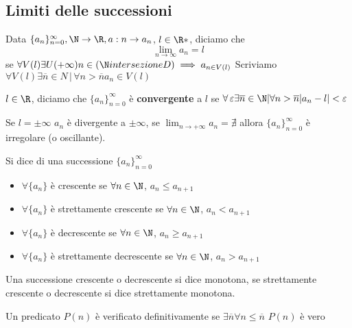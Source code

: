 \subsection{Limiti delle successioni}

Data $ \{a_{n} \}_{n=0}^\infty, \N \to \R, a: n\to a_{n}  $, $l \in \R*$, diciamo che 
\[
    \lim_{n\to\infty}a_{n}=l  
\]
se $\forall V(l) \exists U(+\infty) n \in(\N intersezione D) \implies a_{n \in V(l)}$
Scriviamo $\forall V(l) \exists \overline{n} \in N \,|\, \forall n>\overline{n} a_{n} \in V(l)$

$l\in \R$, diciamo che $ \{a_{n} \}_{n=0}^\infty $ è \textbf{convergente} a $ l $ se $ \forall\, \varepsilon \exists \overline{n} \in \N | \forall n>\overline{n} |a_{n} -l |<\varepsilon  $

Se $ l=\pm \infty $ $a_{n}$ è divergente a $ \pm\infty $, se $ \lim_{n\to+\infty} a_{n}=\nexists $ allora $ \{a_{n}\}_{n=0 }^\infty$ è irregolare (o oscillante).



Si dice di una successione $\{a_{n} \}_{n=0}^\infty$

\begin{itemize}
    \item $\forall \{a_{n} \}$ è crescente se $ \forall n \in \N $, $ a_{n} \le a_{n+1}  $
    \item $\forall\{a_{n} \}$ è strettamente crescente se $ \forall n \in \N $, $ a_{n} < a_{n+1}  $
    \item $\forall\{a_{n} \}$ è decrescente se $ \forall n \in \N $, $ a_{n} \ge a_{n+1}  $
    \item $\forall \{a_{n} \}$ è strettamente decrescente se $ \forall n \in \N $, $ a_{n} > a_{n+1}  $
\end{itemize}
Una successione crescente o decrescente si dice monotona, se strettamente crescente o decrescente si dice strettamente monotona.

Un predicato $ P(n) $ è verificato definitivamente se $ \exists \overline{n} \forall n\le \overline{n}$ $ P(n) $  è vero

